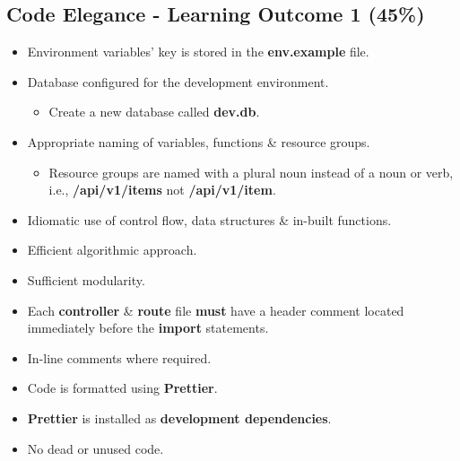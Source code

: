 \documentclass{article}
\begin{document}
\subsection*{Code Elegance - Learning Outcome 1 (45\%)}
\begin{itemize}
	\item Environment variables' key is stored in the \textbf{env.example} file. 
  \item Database configured for the development environment.
  \begin{itemize}
    \item Create a new database called \textbf{dev.db}. 
  \end{itemize}
  \item Appropriate naming of variables, functions \& resource groups.
  \begin{itemize}
	\item Resource groups are named with a plural noun instead of a noun or verb, i.e., \textbf{/api/v1/items} not \textbf{/api/v1/item}.
  \end{itemize}
	\item Idiomatic use of control flow, data structures \& in-built functions.
  \item Efficient algorithmic approach.
  \item Sufficient modularity.
  \item Each \textbf{controller} \& \textbf{route} file \textbf{must} have a header comment located immediately before the \textbf{import} statements.
\item In-line comments where required.
  \item Code is formatted using \textbf{Prettier}.
  \item \textbf{Prettier} is installed as \textbf{development dependencies}.	
\item No dead or unused code. 
\end{itemize}
\end{document}
